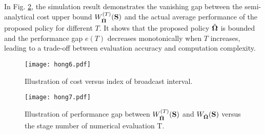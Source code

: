 In Fig. \ref{fig:semi-bound}, the simulation result demonstrates the vanishing gap between the semi-analytical cost upper bound $W^{(T)}_{\hat{\boldsymbol{\Pi}}}(\mathbf{S})$ and the actual average performance of the proposed policy for different $T$.
It shows that the proposed policy $\tilde{\boldsymbol{\Omega}}$ is bounded and the performance gap $e(T)$ decreases monotonically when $T$ increases, leading to a trade-off between evaluation accuracy and computation complexity.

\begin{figure}[ht!]                                                                             %
    \centering                                                                                  %
    \texttt{[image: hong6.pdf]}                     %
    \caption{Illustration of cost versus index of broadcast interval.}
    \label{fig:general_timeline}                                                                %
\end{figure}                                                                                    %

\begin{figure}[ht!]                                                                             %
    \centering                                                                                  %
    \texttt{[image: hong7.pdf]}                     %
    \caption{Illustration of performance gap between $W^{(T)}_{\hat{\boldsymbol{\Pi}}}(\mathbf{S})$ and $W_{\tilde{\boldsymbol{\Omega}}}(\mathbf{S})$ versus the stage number of numerical evaluation T.}
    \label{fig:semi-bound}                                                                %
\end{figure}                                                                                    %

